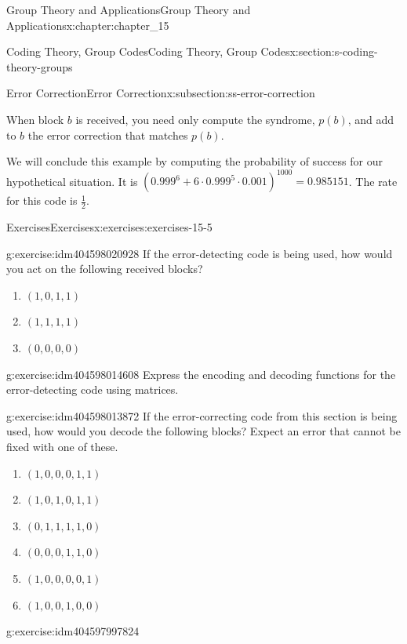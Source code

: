 \documentclass[twoside,10pt,]{book}
\numberwithin{equation}{section}
\begin{document}
\begin{chapterptx}{Group Theory and Applications}{}{Group Theory and Applications}{}{}{x:chapter:chapter_15}
\begin{sectionptx}{Coding Theory, Group Codes}{}{Coding Theory, Group Codes}{}{}{x:section:s-coding-theory-groups}
\begin{subsectionptx}{Error Correction}{}{Error Correction}{}{}{x:subsection:ss-error-correction}
%
\par
When block \(b\) is received, you need only compute the syndrome, \(p(b)\), and add to \(b\) the error correction that matches \(p(b)\).%
\par
We will conclude this example by computing the probability of success for our hypothetical situation. It is  \(\left(0.999^6 + 6 \cdot 0.999^5 \cdot 0.001\right)^{1000}=0.985151\). The rate for this code is \(\frac{1}{2}\).%
\end{subsectionptx}
%
%
\typeout{************************************************}
\typeout{************************************************}
%
\begin{exercises-subsection}{Exercises}{}{Exercises}{}{}{x:exercises:exercises-15-5}
\begin{divisionexercise}{1}{}{}{g:exercise:idm404598020928}%
If the error-detecting code is being used, how would you act on the following received blocks?%
\begin{enumerate}[label=(\alph*)]
\item{}\((1, 0, 1, 1)\)%
\item{}\((1, 1, 1, 1)\)%
\item{}\((0, 0, 0, 0)\)%
\end{enumerate}
%
\end{divisionexercise}%
\begin{divisionexercise}{2}{}{}{g:exercise:idm404598014608}%
Express the encoding and decoding functions for the error-detecting code using matrices.%
\end{divisionexercise}%
\begin{divisionexercise}{3}{}{}{g:exercise:idm404598013872}%
If the error-correcting code from this section is being used, how would you decode the following blocks? Expect an error that cannot be fixed with one of these.%
\begin{enumerate}[label=(\alph*)]
\item{}\((1,0,0,0,1,1)\)%
\item{}\((1,0,1,0,1,1)\)%
\item{}\((0,1,1,1,1,0)\)%
\item{}\((0,0,0,1,1,0)\)%
\item{}\((1,0,0,0,0,1)\)%
\item{}\((1,0,0,1,0,0)\)%
\end{enumerate}
%
\end{divisionexercise}%
\begin{divisionexercise}{4}{}{}{g:exercise:idm404597997824}%

\end{divisionexercise}
\end{exercises-subsection}
\end{sectionptx}
\end{chapterptx}
\end{document}
